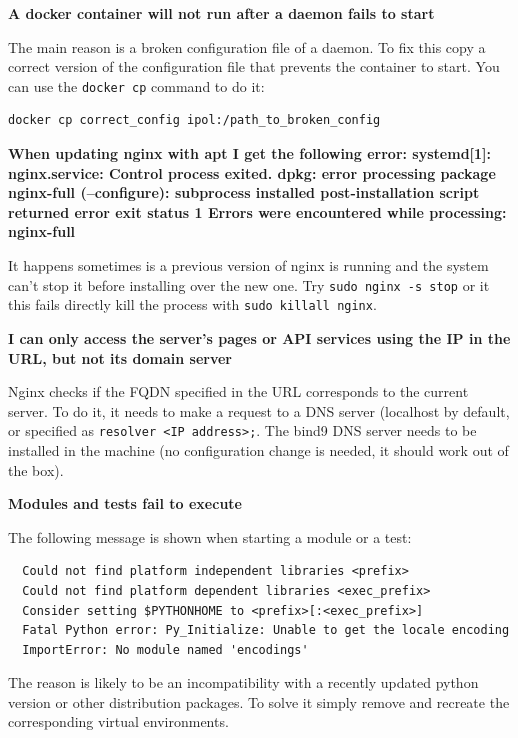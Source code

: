 \documentclass[a4paper,12pt]{article}
\begin{document}
\textbf{A docker container will not run after a daemon fails to start}

The main reason is a broken configuration file of a daemon. To fix this copy a correct version of the configuration file that prevents the container to start. You can use the {\tt docker cp} command to do it:

\begin{verbatim}
docker cp correct_config ipol:/path_to_broken_config
\end{verbatim}

\textbf{When updating nginx with apt I get the following error: systemd[1]: nginx.service: Control process exited. dpkg: error processing package nginx-full (--configure):  subprocess installed post-installation script returned error exit status 1 Errors were encountered while processing:  nginx-full}

It happens sometimes is a previous version of nginx is running and the system can't stop it before installing over the new one. Try {\tt sudo nginx -s stop} or it this fails directly kill the process with {\tt sudo killall nginx}.
\vspace{0.5cm}

\textbf{I can only access the server's pages or API services using the IP in the URL, but not its domain server}

Nginx checks if the FQDN specified in the URL corresponds to the current server. To do it, it needs to make a request to a DNS server (localhost by default, or specified as {\tt resolver <IP address>;}. The bind9 DNS server needs to be installed in the machine (no configuration change is needed, it should work out of the box).
\vspace{0.5cm}

\textbf{Modules and tests fail to execute}

The following message is shown when starting a module or a test:

\begin{verbatim}  
  Could not find platform independent libraries <prefix>
  Could not find platform dependent libraries <exec_prefix>
  Consider setting $PYTHONHOME to <prefix>[:<exec_prefix>]
  Fatal Python error: Py_Initialize: Unable to get the locale encoding
  ImportError: No module named 'encodings'
\end{verbatim}

The reason is likely to be an incompatibility with a recently updated python version or other distribution packages. To solve it simply remove and recreate the corresponding virtual environments.




\end{document}
